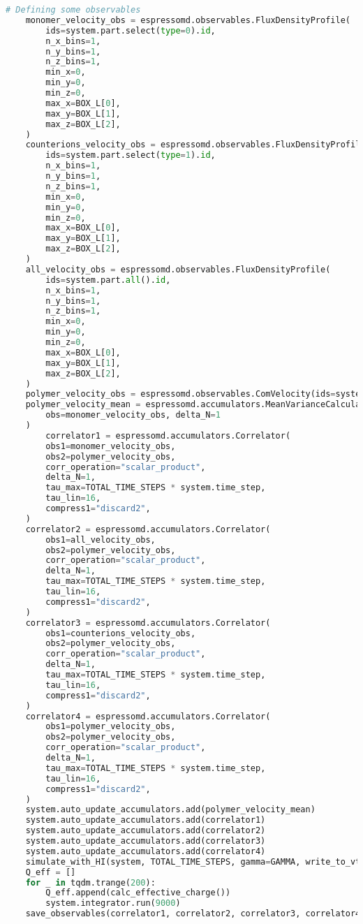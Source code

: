 \begin{lstlisting}[language=python]
	# Defining some observables
	monomer_velocity_obs = espressomd.observables.FluxDensityProfile(
		ids=system.part.select(type=0).id,
		n_x_bins=1,
		n_y_bins=1,
		n_z_bins=1,
		min_x=0,
		min_y=0,
		min_z=0,
		max_x=BOX_L[0],
		max_y=BOX_L[1],
		max_z=BOX_L[2],
	)
	counterions_velocity_obs = espressomd.observables.FluxDensityProfile(
		ids=system.part.select(type=1).id,
		n_x_bins=1,
		n_y_bins=1,
		n_z_bins=1,
		min_x=0,
		min_y=0,
		min_z=0,
		max_x=BOX_L[0],
		max_y=BOX_L[1],
		max_z=BOX_L[2],
	)
	all_velocity_obs = espressomd.observables.FluxDensityProfile(
		ids=system.part.all().id,
		n_x_bins=1,
		n_y_bins=1,
		n_z_bins=1,
		min_x=0,
		min_y=0,
		min_z=0,
		max_x=BOX_L[0],
		max_y=BOX_L[1],
		max_z=BOX_L[2],
	)
	polymer_velocity_obs = espressomd.observables.ComVelocity(ids=system.part.select(type=0).id)
	polymer_velocity_mean = espressomd.accumulators.MeanVarianceCalculator(
		obs=monomer_velocity_obs, delta_N=1
	)
		correlator1 = espressomd.accumulators.Correlator(
		obs1=monomer_velocity_obs,
		obs2=polymer_velocity_obs,
		corr_operation="scalar_product",
		delta_N=1,
		tau_max=TOTAL_TIME_STEPS * system.time_step,
		tau_lin=16,
		compress1="discard2",
	)
	correlator2 = espressomd.accumulators.Correlator(
		obs1=all_velocity_obs,
		obs2=polymer_velocity_obs,
		corr_operation="scalar_product",
		delta_N=1,
		tau_max=TOTAL_TIME_STEPS * system.time_step,
		tau_lin=16,
		compress1="discard2",
	)
	correlator3 = espressomd.accumulators.Correlator(
		obs1=counterions_velocity_obs,
		obs2=polymer_velocity_obs,
		corr_operation="scalar_product",
		delta_N=1,
		tau_max=TOTAL_TIME_STEPS * system.time_step,
		tau_lin=16,
		compress1="discard2",
	)
	correlator4 = espressomd.accumulators.Correlator(
		obs1=polymer_velocity_obs,
		obs2=polymer_velocity_obs,
		corr_operation="scalar_product",
		delta_N=1,
		tau_max=TOTAL_TIME_STEPS * system.time_step,
		tau_lin=16,
		compress1="discard2",
	)
	system.auto_update_accumulators.add(polymer_velocity_mean)
	system.auto_update_accumulators.add(correlator1)
	system.auto_update_accumulators.add(correlator2)
	system.auto_update_accumulators.add(correlator3)
	system.auto_update_accumulators.add(correlator4)
	simulate_with_HI(system, TOTAL_TIME_STEPS, gamma=GAMMA, write_to_vtf=WRITE_TO_VTF)
	Q_eff = []
	for _ in tqdm.trange(200):
		Q_eff.append(calc_effective_charge())
		system.integrator.run(9000)
	save_observables(correlator1, correlator2, correlator3, correlator4, polymer_velocity_mean, Q_eff)
\end{lstlisting}